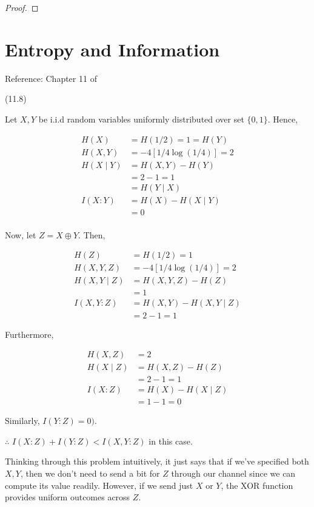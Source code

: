 \documentclass[main.tex]{subfiles}
\begin{document}
\begin{subappendices}
\begin{exercise}
\begin{proof}
	\end{proof}

\end{exercise}

\section{Entropy and Information}
Reference: Chapter 11 of \cite{nielsen2010quantum}

\begin{exercise}(11.8)

Let $X, Y$ be i.i.d random variables uniformly distributed over set $\{0, 1\}$. Hence, 

\begin{align*}
H(X) &= H(1/2) = 1 = H(Y)\\
H(X,Y) &= - 4 [ 1/4 \log (1/4)] = 2\\
H(X \mid Y) &= H(X, Y) - H(Y)\\ &= 2 - 1 = 1 \\&= H(Y \mid X) \\
I(X : Y) &= H(X) - H(X \mid Y)\\ &= 0\\
\end{align*}

Now, let $Z = X \oplus Y$. Then, 

\begin{align*}
H(Z) &= H(1/2) = 1 \\
H(X, Y, Z) &= - 4 [ 1/4 \log (1/4)] = 2 \\
H(X,Y \mid Z) &= H(X, Y, Z) - H(Z)\\ &= 1\\
I(X, Y : Z) &= H(X, Y) - H(X, Y \mid Z) \\ &= 2 - 1 = 1
\end{align*}

Furthermore,

\begin{align*} 
H(X, Z) &= 2\\
H(X \mid Z) &= H(X, Z) - H(Z)\\
&= 2 - 1 = 1 \\ 
I(X : Z) &= H(X) - H(X \mid Z) \\
&= 1 - 1 = 0
\end{align*}

Similarly, $I(Y:Z) = 0)$. 

$\therefore$ $I(X:Z) + I(Y:Z) < I(X, Y : Z)$ in this case.

Thinking through this problem intuitively, it just says that if we've specified both $X,Y$, then we don't need to send a bit for $Z$ through our channel since we can compute its value readily. However, if we send just $X$ or $Y$, the XOR function provides uniform outcomes across $Z$.
\end{exercise}


\end{subappendices}
\end{document}
